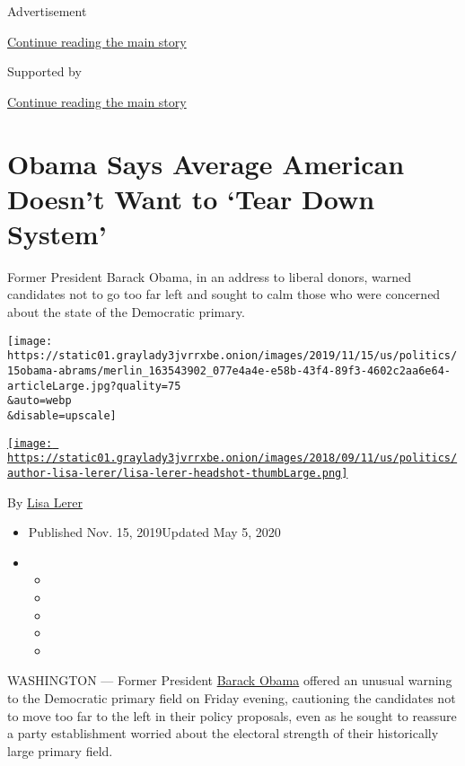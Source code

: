 Advertisement

\protect\hyperlink{after-top}{Continue reading the main story}

Supported by

\protect\hyperlink{after-sponsor}{Continue reading the main story}

\hypertarget{obama-says-average-american-doesnt-want-to-tear-down-system}{%
\section{Obama Says Average American Doesn't Want to `Tear Down
System'}\label{obama-says-average-american-doesnt-want-to-tear-down-system}}

Former President Barack Obama, in an address to liberal donors, warned
candidates not to go too far left and sought to calm those who were
concerned about the state of the Democratic primary.

\texttt{[image: https://static01.graylady3jvrrxbe.onion/images/2019/11/15/us/politics/15obama-abrams/merlin\_163543902\_077e4a4e-e58b-43f4-89f3-4602c2aa6e64-articleLarge.jpg?quality=75\\\&auto=webp\\\&disable=upscale]}

\href{https://www.nytimes3xbfgragh.onion/by/lisa-lerer}{\texttt{[image: https://static01.graylady3jvrrxbe.onion/images/2018/09/11/us/politics/author-lisa-lerer/lisa-lerer-headshot-thumbLarge.png]}}

By \href{https://www.nytimes3xbfgragh.onion/by/lisa-lerer}{Lisa Lerer}

\begin{itemize}
\item
  Published Nov. 15, 2019Updated May 5, 2020
\item
  \begin{itemize}
  \item
  \item
  \item
  \item
  \item
  \end{itemize}
\end{itemize}

WASHINGTON --- Former President
\href{https://www.nytimes3xbfgragh.onion/2020/05/05/us/barack-obama-virtual-commencement-speech-coronavirus.html}{Barack
Obama} offered an unusual warning to the Democratic primary field on
Friday evening, cautioning the candidates not to move too far to the
left in their policy proposals, even as he sought to reassure a party
establishment worried about the electoral strength of their historically
large primary field.

